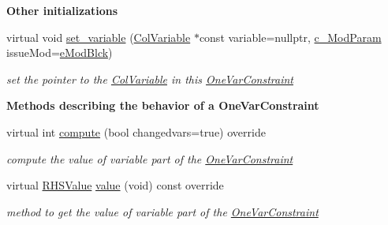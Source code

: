 \begin{Indent}\textbf{ Other initializations}\par
\begin{DoxyCompactItemize}
\item 
virtual void \mbox{\hyperlink{class_s_m_spp__di__unipi__it_1_1_one_var_constraint_a1a242762e0f2821e2676a295a766fdb6}{set\+\_\+variable}} (\mbox{\hyperlink{class_s_m_spp__di__unipi__it_1_1_col_variable}{Col\+Variable}} $\ast$const variable=nullptr, \mbox{\hyperlink{group___modification___t_y_p_e_s_ga544246d8c462e9a2d817c2c30797968f}{c\+\_\+\+Mod\+Param}} issue\+Mod=\mbox{\hyperlink{group___modification___t_y_p_e_s_gga48fddcdd03a03f49b7e389ca1ed938d4a21b14b26b1c0093a0905f6fc010bad29}{e\+Mod\+Blck}})
\begin{DoxyCompactList}\small\item\em set the pointer to the \mbox{\hyperlink{class_s_m_spp__di__unipi__it_1_1_col_variable}{Col\+Variable}} in this \mbox{\hyperlink{class_s_m_spp__di__unipi__it_1_1_one_var_constraint}{One\+Var\+Constraint}} \end{DoxyCompactList}\end{DoxyCompactItemize}
\end{Indent}
\begin{Indent}\textbf{ Methods describing the behavior of a One\+Var\+Constraint}\par
\begin{DoxyCompactItemize}
\item 
virtual int \mbox{\hyperlink{class_s_m_spp__di__unipi__it_1_1_one_var_constraint_afc8ff54ab05d22f4cca0fb0bfbeb7a49}{compute}} (bool changedvars=true) override
\begin{DoxyCompactList}\small\item\em compute the value of variable part of the \mbox{\hyperlink{class_s_m_spp__di__unipi__it_1_1_one_var_constraint}{One\+Var\+Constraint}} \end{DoxyCompactList}\item 
virtual \mbox{\hyperlink{class_s_m_spp__di__unipi__it_1_1_row_constraint_a8813536ab3b13a81c8e83a999ade3bd8}{R\+H\+S\+Value}} \mbox{\hyperlink{class_s_m_spp__di__unipi__it_1_1_one_var_constraint_ad9256be16b98f3b557f54fa5e2118db7}{value}} (void) const override
\begin{DoxyCompactList}\small\item\em method to get the value of variable part of the \mbox{\hyperlink{class_s_m_spp__di__unipi__it_1_1_one_var_constraint}{One\+Var\+Constraint}} \end{DoxyCompactList}\end{DoxyCompactItemize}
\end{Indent}
